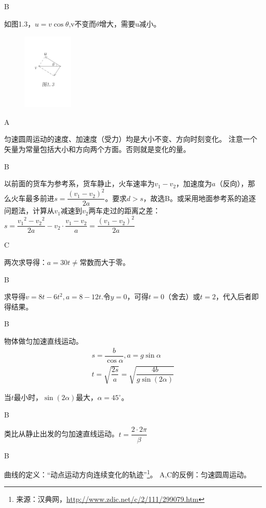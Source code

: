\documentclass[b5paper,opensource]{qyxf-book}
\begin{document}
B

\solve 如图1.3，$u=v\cos\theta$,v不变而$\theta$增大，需要u减小。

\begin{figure}[htbp]
	\centering
	\includegraphics[width=6.5em,height=10em]{Chp1_illus3.png}
	\label{fig:Chp1_illus2}
\end{figure}


A

\solve 匀速圆周运动的速度、加速度（受力）均是大小不变、方向时刻变化。
注意一个矢量为常量包括大小和方向两个方面。否则就是变化的量。

B

\solve 以前面的货车为参考系，货车静止，火车速率为$v_1-v_2$，加速度为$a$（反向），那么火车最多前进$s=\dfrac{{(v_1-v_2)}^2}{2a}$。要求$d>s$，故选B。或采用地面参考系的追逐问题法，计算从$v_1\text{减速到}v_2$两车走过的距离之差：$s=\dfrac{{v_1}^2-{v_2}^2}{2a}-v_2\cdot \dfrac{v_1-v_2}{a}=\dfrac{{(v_1-v_2)}^2}{2a}$

C

\solve 两次求导得：$a=30t\neq$常数而大于零。

B

\solve 求导得$v=8t-6t^2,a=8-12t$.令$y=0$，可得$t=0$（舍去）或$t=2$，代入后者即得结果。

B

\solve 物体做匀加速直线运动。
\begin{gather*}
s=\dfrac{b}{\cos\alpha},a=g\sin\alpha\\
t=\sqrt{\dfrac{2s}{a}}=\sqrt{\dfrac{4b}{g\sin(2\alpha)}}
\end{gather*}

当$t$最小时，$\sin(2\alpha)$最大，$\alpha=45^\circ$。

B

\solve 类比从静止出发的匀加速直线运动。$t=\dfrac{2\cdot 2\pi}{\beta}$

B

\solve 曲线的定义：“动点运动方向连续变化的轨迹”\footnote{来源：汉典网，\url{http://www.zdic.net/c/2/111/299079.htm}}。
A,C的反例：匀速圆周运动。
\end{document}
